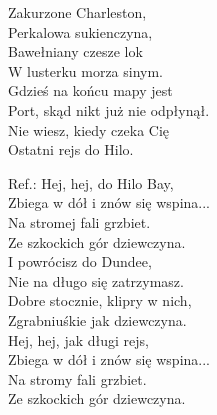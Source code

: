 \vspace{1em}
\begin{multicols}{2}
Zakurzone Charleston, \\
Perkalowa sukienczyna, \\
Bawełniany czesze lok \\
W lusterku morza sinym. \\


Gdzieś na końcu mapy jest \\
Port, skąd nikt już nie odpłynął. \\
Nie wiesz, kiedy czeka Cię \\
Ostatni rejs do Hilo. \\
\newcolumn

Ref.: Hej, hej, do Hilo Bay, \\
Zbiega w dół i znów się wspina... \\
Na stromej fali grzbiet. \\
Ze szkockich gór dziewczyna. \\

I powrócisz do Dundee, \\
Nie na długo się zatrzymasz. \\
Dobre stocznie, klipry w nich, \\
Zgrabniuśkie jak dziewczyna. \\

Hej, hej, jak długi rejs, \\
Zbiega w dół i znów się wspina... \\
Na stromy fali grzbiet. \\
Ze szkockich gór dziewczyna.
\end{multicols}